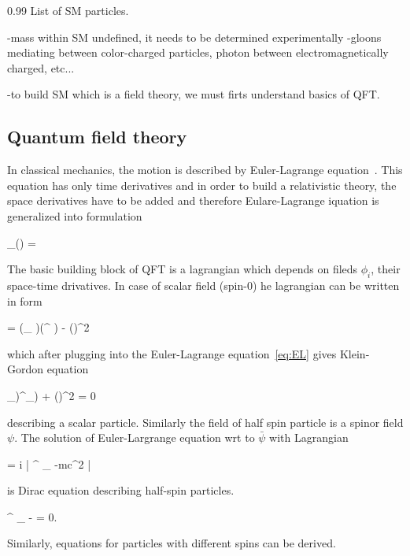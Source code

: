                  {0.99}       %
                 { List of SM particles. }

-mass within SM undefined, it needs to be determined experimentally
-gloons mediating between color-charged particles, photon between electromagnetically charged, etc...

-to build SM which is a field theory, we must firts understand basics of QFT.

\subsection{Quantum field theory}

In classical mechanics, the motion is described by Euler-Lagrange equation~\cite{9783527411887}. This equation has only time derivatives and in order to build a relativistic theory, the space derivatives have to be added and therefore Eulare-Lagrange iquation is generalized into formulation

{
 \partial_{\mu}() = 
}


The basic building block of  QFT is a lagrangian which depends on fileds $\phi_{i}$, their space-time drivatives. In case of scalar field (spin-0) he lagrangian can be written in form 

{
  = (\partial_{\mu} \phi)(\partial^{\mu} \phi) -  ()^{2} 
}

which after plugging into the Euler-Lagrange equation~\ref{eq:EL} gives Klein-Gordon equation

{
 \partial_{\mu)}\partial^{\mu}_\phi) + ()^{2} \phi = 0
}

 describing a scalar particle. Similarly the field of half spin particle is a spinor field $\psi$. The solution of Euler-Largrange equation wrt to $\bar{\psi}$ with Lagrangian


{
  = i \bar{\psi} \gamma^{\mu} \partial_{\mu} \psi -mc^{2} \bar{\psi} \psi
}

is Dirac equation describing half-spin particles.

{
  \gamma^{\mu} \partial_{\mu} \psi -  = 0.
}

Similarly, equations for particles with different spins can be derived.

